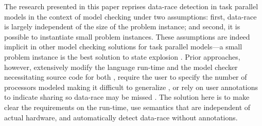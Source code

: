 The research presented in this paper reprises data-race detection in task parallel models in the context of model checking under two assumptions: first, data-race is largely independent of the size of the problem instance; and second, it is possible to instantiate small problem instances. These assumptions are indeed implicit in other model checking solutions for task parallel models---a small problem instance is the best solution to state explosion \cite{gligoric2012x10x,zirkel2013automated,anderson2014jpf}. Prior approaches, however, extensively modify the language run-time and the model checker necessitating source code for both \cite{gligoric2012x10x}, require the user to specify the number of processors modeled making it difficult to generalize \cite{zirkel2013automated}, or rely on user annotations to indicate sharing so data-race may be missed \cite{anderson2014jpf}. The solution here is to make clear the requirements on the run-time, use semantics that are independent of actual hardware, and automatically detect data-race without annotations. 

